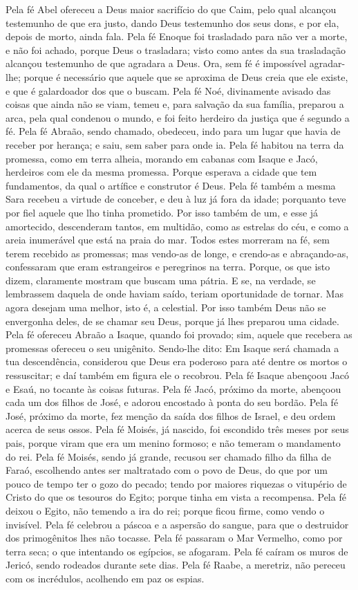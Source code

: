 Pela fé Abel ofereceu a Deus maior sacrifício do que Caim, pelo
qual alcançou testemunho de que era justo, dando Deus testemunho dos
seus dons, e por ela, depois de morto, ainda fala. Pela fé
Enoque foi trasladado para não ver a morte, e não foi achado, porque
Deus o trasladara; visto como antes da sua trasladação alcançou
testemunho de que agradara a Deus. Ora, sem fé é impossível
agradar-lhe; porque é necessário que aquele que se aproxima de Deus
creia que ele existe, e que é galardoador dos que o buscam. Pela
fé Noé, divinamente avisado das coisas que ainda não se viam, temeu
e, para salvação da sua família, preparou a arca, pela qual condenou
o mundo, e foi feito herdeiro da justiça que é segundo a fé.
Pela fé Abraão, sendo chamado, obedeceu, indo para um lugar que
havia de receber por herança; e saiu, sem saber para onde ia.
Pela fé habitou na terra da promessa, como em terra alheia,
morando em cabanas com Isaque e Jacó, herdeiros com ele da mesma
promessa. Porque esperava a cidade que tem fundamentos, da
qual o artífice e construtor é Deus. Pela fé também a mesma
Sara recebeu a virtude de conceber, e deu à luz já fora da idade;
porquanto teve por fiel aquele que lho tinha prometido. Por
isso também de um, e esse já amortecido, descenderam tantos, em
multidão, como as estrelas do céu, e como a areia inumerável que
está na praia do mar. Todos estes morreram na fé, sem terem
recebido as promessas; mas vendo-as de longe, e crendo-as e
abraçando-as, confessaram que eram estrangeiros e peregrinos na
terra. Porque, os que isto dizem, claramente mostram que
buscam uma pátria. E se, na verdade, se lembrassem daquela de
onde haviam saído, teriam oportunidade de tornar. Mas agora
desejam uma melhor, isto é, a celestial. Por isso também Deus não se
envergonha deles, de se chamar seu Deus, porque já lhes preparou uma
cidade. Pela fé ofereceu Abraão a Isaque, quando foi provado;
sim, aquele que recebera as promessas ofereceu o seu unigênito.
Sendo-lhe dito: Em Isaque será chamada a tua descendência,
considerou que Deus era poderoso para até dentre os mortos o
ressuscitar; e daí também em figura ele o recobrou.
Pela fé Isaque abençoou Jacó e Esaú, no tocante às coisas
futuras. Pela fé Jacó, próximo da morte, abençoou cada um dos
filhos de José, e adorou encostado à ponta do seu bordão.
Pela fé José, próximo da morte, fez menção da saída dos
filhos de Israel, e deu ordem acerca de seus ossos. Pela fé
Moisés, já nascido, foi escondido três meses por seus pais, porque
viram que era um menino formoso; e não temeram o mandamento do rei.
Pela fé Moisés, sendo já grande, recusou ser chamado filho da
filha de Faraó, escolhendo antes ser maltratado com o povo de
Deus, do que por um pouco de tempo ter o gozo do pecado;
tendo por maiores riquezas o vitupério de Cristo do que os
tesouros do Egito; porque tinha em vista a recompensa. Pela
fé deixou o Egito, não temendo a ira do rei; porque ficou firme,
como vendo o invisível. Pela fé celebrou a páscoa e a
aspersão do sangue, para que o destruidor dos primogênitos lhes não
tocasse. Pela fé passaram o Mar Vermelho, como por terra
seca; o que intentando os egípcios, se afogaram. Pela fé
caíram os muros de Jericó, sendo rodeados durante sete dias.
Pela fé Raabe, a meretriz, não pereceu com os incrédulos,
acolhendo em paz os espias.

